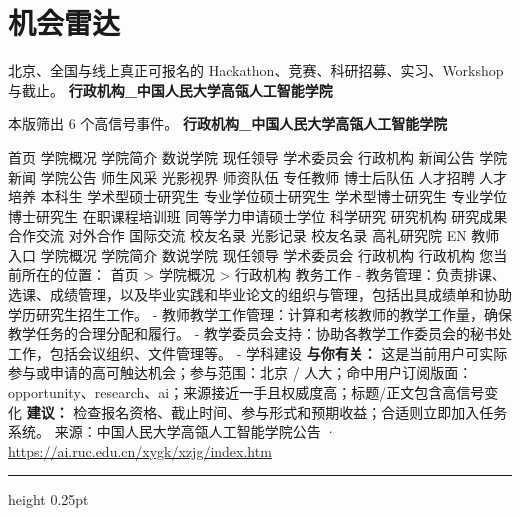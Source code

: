 \documentclass[10.5pt]{ctexart}
\begin{document}
\section*{机会雷达}
{\color{ormuted} 北京、全国与线上真正可报名的 Hackathon、竞赛、科研招募、实习、Workshop 与截止。}
\vspace{2mm}
{\LARGE\bfseries 行政机构\_中国人民大学高瓴人工智能学院}\par
\vspace{1mm}
{\color{ormuted} 本版筛出 6 个高信号事件。}
\vspace{3mm}
{\Large\bfseries 行政机构\_中国人民大学高瓴人工智能学院}\par
首页 学院概况 学院简介 数说学院 现任领导 学术委员会 行政机构 新闻公告 学院新闻 学院公告 师生风采 光影视界 师资队伍 专任教师 博士后队伍 人才招聘 人才培养 本科生 学术型硕士研究生 专业学位硕士研究生 学术型博士研究生 专业学位博士研究生 在职课程培训班 同等学力申请硕士学位 科学研究 研究机构 研究成果 合作交流 对外合作 国际交流 校友名录 光影记录 校友名录 高礼研究院 EN 教师入口 学院概况 学院简介 数说学院 现任领导 学术委员会 行政机构 行政机构 您当前所在的位置： 首页 > 学院概况 > 行政机构 教务工作 - 教务管理：负责排课、选课、成绩管理，以及毕业实践和毕业论文的组织与管理，包括出具成绩单和协助学历研究生招生工作。 - 教师教学工作管理：计算和考核教师的教学工作量，确保教学任务的合理分配和履行。 - 教学委员会支持：协助各教学工作委员会的秘书处工作，包括会议组织、文件管理等。 - 学科建设
\textbf{与你有关：} 这是当前用户可实际参与或申请的高可触达机会；参与范围：北京 / 人大；命中用户订阅版面：opportunity、research、ai；来源接近一手且权威度高；标题/正文包含高信号变化
\textbf{建议：} 检查报名资格、截止时间、参与形式和预期收益；合适则立即加入任务系统。
{\footnotesize\color{ormuted} 来源：中国人民大学高瓴人工智能学院公告 · \url{https://ai.ruc.edu.cn/xygk/xzjg/index.htm}}
\vspace{4mm}
\hrule height 0.25pt
\vspace{3mm}
\end{document}
